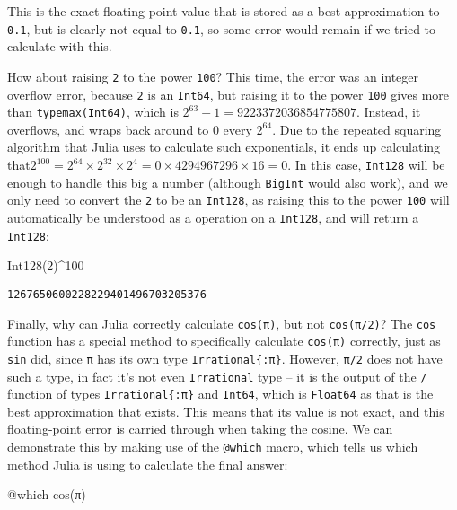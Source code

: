 \documentclass[
  letterpaper,
  DIV=11,
  numbers=noendperiod]{scrreprt}
\newenvironment{Shaded}{\begin{snugshade}}{\end{snugshade}}
\newcommand{\ConstantTok}[1]{\textcolor[rgb]{0.56,0.35,0.01}{#1}}
\newcommand{\FloatTok}[1]{\textcolor[rgb]{0.68,0.00,0.00}{#1}}
\newcommand{\FunctionTok}[1]{\textcolor[rgb]{0.28,0.35,0.67}{#1}}
\newcommand{\NormalTok}[1]{\textcolor[rgb]{0.00,0.23,0.31}{#1}}
\newcommand{\OperatorTok}[1]{\textcolor[rgb]{0.37,0.37,0.37}{#1}}
\newcommand{\PreprocessorTok}[1]{\textcolor[rgb]{0.68,0.00,0.00}{#1}}
\begin{document}
This is the exact floating-point value that is stored as a best
approximation to \texttt{0.1}, but is clearly not equal to \texttt{0.1},
so some error would remain if we tried to calculate with this.

How about raising \texttt{2} to the power \texttt{100}? This time, the
error was an integer overflow error, because \texttt{2} is an
\texttt{Int64}, but raising it to the power \texttt{100} gives more than
\texttt{typemax(Int64)}, which is \(2^{63} - 1 = 9223372036854775807\).
Instead, it overflows, and wraps back around to \(0\) every \(2^{64}\).
Due to the repeated squaring algorithm that Julia uses to calculate such
exponentials, it ends up calculating
that\(2^{100} = 2^{64} \times 2^{32} \times 2^{4} = 0 \times 4294967296 \times 16 = 0\).
In this case, \texttt{Int128} will be enough to handle this big a number
(although \texttt{BigInt} would also work), and we only need to convert
the \texttt{2} to be an \texttt{Int128}, as raising this to the power
\texttt{100} will automatically be understood as a operation on a
\texttt{Int128}, and will return a \texttt{Int128}:

\begin{Shaded}
\begin{Highlighting}[]
\FunctionTok{Int128}\NormalTok{(}\FloatTok{2}\NormalTok{)}\OperatorTok{\^{}}\FloatTok{100}
\end{Highlighting}
\end{Shaded}

\begin{verbatim}
1267650600228229401496703205376
\end{verbatim}

Finally, why can Julia correctly calculate \texttt{cos(π)}, but not
\texttt{cos(π/2)}? The \texttt{cos} function has a special method to
specifically calculate \texttt{cos(π)} correctly, just as \texttt{sin}
did, since \texttt{π} has its own type \texttt{Irrational\{:π\}}.
However, \texttt{π/2} does not have such a type, in fact it's not even
\texttt{Irrational} type -- it is the output of the \texttt{/} function
of types \texttt{Irrational\{:π\}} and \texttt{Int64}, which is
\texttt{Float64} as that is the best approximation that exists. This
means that its value is not exact, and this floating-point error is
carried through when taking the cosine. We can demonstrate this by
making use of the \texttt{@which} macro, which tells us which method
Julia is using to calculate the final answer:

\begin{Shaded}
\begin{Highlighting}[]
\PreprocessorTok{@which} \FunctionTok{cos}\NormalTok{(}\ConstantTok{π}\NormalTok{)}
\end{Highlighting}
\end{Shaded}
\end{document}
